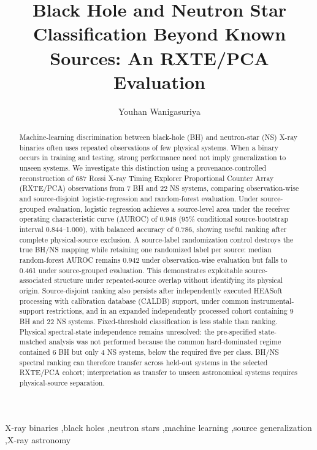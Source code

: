 \documentclass[final,5p,authoryear,nopreprintline]{elsarticle}
\begin{document}
\begin{frontmatter}
\title{Black Hole and Neutron Star Classification Beyond Known Sources: An RXTE/PCA Evaluation}
\author[colombo]{Youhan Wanigasuriya}
\address[colombo]{Department of Chemistry, Faculty of Science, University of Colombo,
PO Box 1490, University of Colombo, Colombo 00300, Sri Lanka}

\begin{abstract}
Machine-learning discrimination between black-hole (BH) and neutron-star (NS) X-ray binaries often uses repeated observations of few physical systems. When a binary occurs in training and testing, strong performance need not imply generalization to unseen systems. We investigate this distinction using a provenance-controlled reconstruction of 687 Rossi X-ray Timing Explorer Proportional Counter Array (RXTE/PCA) observations from 7 BH and 22 NS systems, comparing observation-wise and source-disjoint logistic-regression and random-forest evaluation. Under source-grouped evaluation, logistic regression achieves a source-level area under the receiver operating characteristic curve (AUROC) of 0.948 (95\% conditional source-bootstrap interval 0.844--1.000), with balanced accuracy of 0.786, showing useful ranking after complete physical-source exclusion. A source-label randomization control destroys the true BH/NS mapping while retaining one randomized label per source: median random-forest AUROC remains 0.942 under observation-wise evaluation but falls to 0.461 under source-grouped evaluation. This demonstrates exploitable source-associated structure under repeated-source overlap without identifying its physical origin. Source-disjoint ranking also persists after independently executed HEASoft processing with calibration database (CALDB) support, under common instrumental-support restrictions, and in an expanded independently processed cohort containing 9 BH and 22 NS systems. Fixed-threshold classification is less stable than ranking. Physical spectral-state independence remains unresolved: the pre-specified state-matched analysis was not performed because the common hard-dominated regime contained 6 BH but only 4 NS systems, below the required five per class. BH/NS spectral ranking can therefore transfer across held-out systems in the selected RXTE/PCA cohort; interpretation as transfer to unseen astronomical systems requires physical-source separation.
\end{abstract}
\begin{keyword}
X-ray binaries \sep black holes \sep neutron stars \sep machine learning \sep source generalization \sep X-ray astronomy
\end{keyword}
\end{frontmatter}
\thispagestyle{plain}
\end{document}

